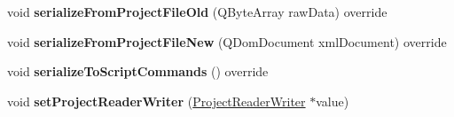 \begin{DoxyCompactItemize}
\item 
void {\bfseries serialize\+From\+Project\+File\+Old} (Q\+Byte\+Array raw\+Data) override\hypertarget{class_map_data_a53865a41585c80e967109f356a013643}{}\label{class_map_data_a53865a41585c80e967109f356a013643}

\item 
void {\bfseries serialize\+From\+Project\+File\+New} (Q\+Dom\+Document xml\+Document) override\hypertarget{class_map_data_ab97fc023216e24e83fbaacb29838d314}{}\label{class_map_data_ab97fc023216e24e83fbaacb29838d314}

\item 
void {\bfseries serialize\+To\+Script\+Commands} () override\hypertarget{class_map_data_afd21073a33a0c3d3777f688c2ef6c676}{}\label{class_map_data_afd21073a33a0c3d3777f688c2ef6c676}

\item 
void {\bfseries set\+Project\+Reader\+Writer} (\hyperlink{class_project_reader_writer}{Project\+Reader\+Writer} $\ast$value)\hypertarget{class_map_data_a772cf725d005ddd2dd764b5842de9fdd}{}\label{class_map_data_a772cf725d005ddd2dd764b5842de9fdd}

\end{DoxyCompactItemize}
